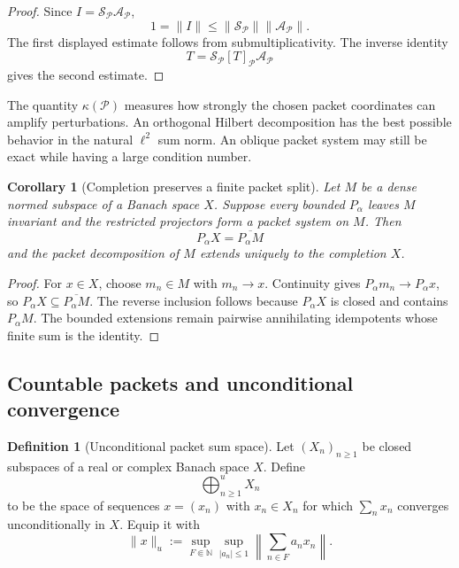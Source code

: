 \documentclass[11pt]{article}
\newtheorem{corollary}[corollary]{Corollary}
\theoremstyle{definition}
\newtheorem{definition}[definition]{Definition}
\theoremstyle{remark}
\theoremstyle{definition}\newtheorem{example}[theorem]{Example}
\newcommand{\Pcal}{\mathcal P}
\newcommand{\cl}[1]{\overline{#1}}
\newcommand{\RecordID}[1]{\label{record:#1}}
\newcommand{\Depends}[1]{}
\begin{document}
\begin{proof}
Since $I=\mathcal S_{\Pcal}\mathcal A_{\Pcal}$,
\[
1=\|I\|\leq\|\mathcal S_{\Pcal}\|\|\mathcal A_{\Pcal}\|.
\]
The first displayed estimate follows from submultiplicativity.  The inverse identity
\[
T=\mathcal S_{\Pcal}[T]_{\Pcal}\mathcal A_{\Pcal}
\]
gives the second estimate.
\end{proof}

\begin{interpretation}
The quantity \(\kappa(\Pcal)\) measures how strongly the chosen packet coordinates can amplify perturbations.  An orthogonal Hilbert decomposition has the best possible behavior in the natural \(\ell^2\) sum norm.  An oblique packet system may still be exact while having a large condition number.
\end{interpretation}


\begin{corollary}[Completion preserves a finite packet split]
\label{cor:completion-packet-split}
Let $M$ be a dense normed subspace of a Banach space $X$.  Suppose every bounded $P_\alpha$ leaves $M$ invariant and the restricted projectors form a packet system on $M$.  Then
\[
P_\alpha X=\cl{P_\alpha M}
\]
and the packet decomposition of $M$ extends uniquely to the completion $X$.
\end{corollary}
\RecordID{PSC-I-C-COMPLETION-PACKET-SPLIT}
\Depends{PSC-I-T-BANACH-PACKET-ISOMORPHISM.}

\begin{proof}
For $x\in X$, choose $m_n\in M$ with $m_n\to x$.  Continuity gives $P_\alpha m_n\to P_\alpha x$, so $P_\alpha X\subseteq\cl{P_\alpha M}$.  The reverse inclusion follows because $P_\alpha X$ is closed and contains $P_\alpha M$.  The bounded extensions remain pairwise annihilating idempotents whose finite sum is the identity.
\end{proof}

\subsection{Countable packets and unconditional convergence}
\begin{definition}[Unconditional packet sum space]
\label{def:unconditional-packet-space}
Let $(X_n)_{n\geq1}$ be closed subspaces of a real or complex Banach space $X$.  Define
\[
\bigoplus_{n\geq1}^{u}X_n
\]
to be the space of sequences $x=(x_n)$ with $x_n\in X_n$ for which $\sum_nx_n$ converges unconditionally in $X$.  Equip it with
\[
\|x\|_u
:=
\sup_{F\Subset\mathbb N}
\sup_{|a_n|\leq1}
\left\|\sum_{n\in F}a_nx_n\right\|.
\]
\end{definition}
\RecordID{PSC-I-D-UNCONDITIONAL-PACKET-SPACE}
\end{document}
